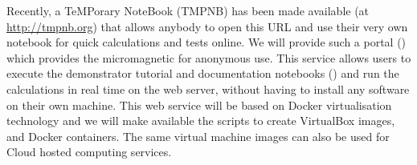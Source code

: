 \begin{workpackage}
\begin{tasklist}
\begin{task}[lead=USO,title=Demonstrator: micromagnetic VRE notebooks,
  id=oommf-tutorial-and-documentation,PM=6,partners={SR,PS},wphases=15-21]

\end{task}

\begin{task}[lead=USO,id=oommf-nb-ve,title=Online portal for
  micromagnetic VRE demonstrator,PM=3,partners={SR,JU},wphases=21-24]

  Recently, a TeMPorary \Jupyter NoteBook (TMPNB) has been made
  available (at \href{http://tmpnb.org}{http://tmpnb.org}) that allows
  anybody to open this URL and use their very own \Jupyter notebook
  for quick calculations and tests online. We will provide such a
  portal () which provides the
  micromagnetic \VRE for anonymous use. This service allows users to
  execute the demonstrator tutorial and documentation notebooks
  () and run the
  calculations in real time on the web server, without having to
  install any software on their own machine.  This web service will be
  based on Docker \cite{Docker} virtualisation technology and we will
  make available the scripts to create VirtualBox \cite{Virtualbox}
  images, and Docker containers. The same virtual machine images can
  also be used for Cloud hosted computing services.


\end{task}
\end{tasklist}
\end{workpackage}
